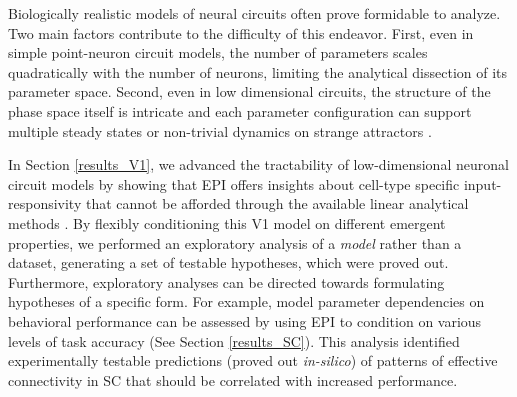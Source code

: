 \documentclass[11pt]{article}
\begin{document}
Biologically realistic models of neural circuits often prove formidable to analyze.
Two main factors contribute to the difficulty of this endeavor.
First, even in simple point-neuron circuit models, the number of parameters scales quadratically with the number of neurons, limiting the analytical dissection of its parameter space. 
Second, even in low dimensional circuits, the structure of the phase space itself is intricate and each parameter configuration can support multiple steady states \cite{kraynyukova2018stabilized} or non-trivial dynamics on strange attractors \cite{morrison2016diversity}.

In Section \ref{results_V1}, we advanced the tractability of low-dimensional neuronal circuit models by showing that EPI offers insights about cell-type specific input-responsivity that cannot be afforded through the available linear analytical methods  \cite{litwin2016inhibitory, GarciaDelMolino2017, Chen2019}. 
By flexibly conditioning this V1 model on different emergent properties, we performed an exploratory analysis of a \emph{model} rather than a dataset, generating a set of testable hypotheses, which were proved out. 
Furthermore, exploratory analyses can be directed towards formulating hypotheses of a specific form. 
For example, model parameter dependencies on behavioral performance can be assessed by using EPI to condition on various levels of task accuracy (See Section \ref{results_SC}). 
This analysis identified experimentally testable predictions (proved out \textit{in-silico}) of patterns of effective connectivity in SC that should be correlated with increased performance.
\end{document}
